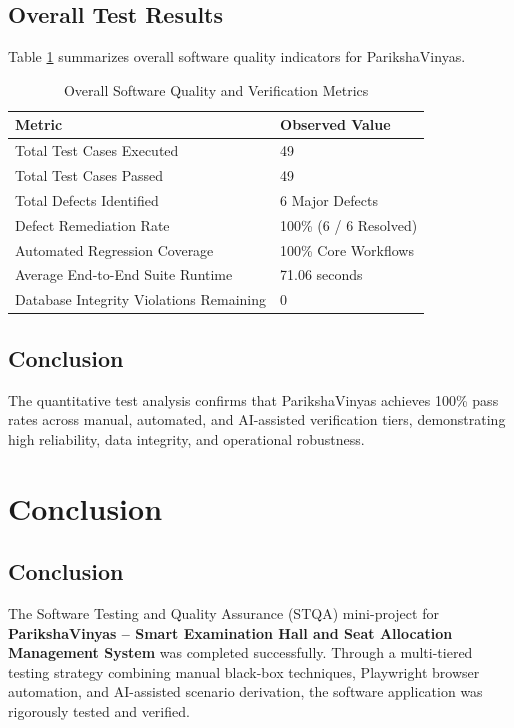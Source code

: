 \documentclass{InternshipReport}
\begin{document}
\section{Overall Test Results}
Table \ref{tab:overall_results} summarizes overall software quality indicators for ParikshaVinyas.

\begin{table}[H]
\centering
\caption{Overall Software Quality and Verification Metrics}
\label{tab:overall_results}
\begin{tabular}{p{} p{}}
\toprule
\textbf{Metric} & \textbf{Observed Value} \\
\midrule
Total Test Cases Executed & 49 \\
Total Test Cases Passed & 49 \\
Total Defects Identified & 6 Major Defects \\
Defect Remediation Rate & 100\% (6 / 6 Resolved) \\
Automated Regression Coverage & 100\% Core Workflows \\
Average End-to-End Suite Runtime & 71.06 seconds \\
Database Integrity Violations Remaining & 0 \\
\bottomrule
\end{tabular}
\end{table}

\section{Conclusion}
The quantitative test analysis confirms that ParikshaVinyas achieves 100\% pass rates across manual, automated, and AI-assisted verification tiers, demonstrating high reliability, data integrity, and operational robustness.


\chapter{Conclusion}

\section{Conclusion}
The Software Testing and Quality Assurance (STQA) mini-project for \textbf{ParikshaVinyas -- Smart Examination Hall and Seat Allocation Management System} was completed successfully. Through a multi-tiered testing strategy combining manual black-box techniques, Playwright browser automation, and AI-assisted scenario derivation, the software application was rigorously tested and verified.
\end{document}
